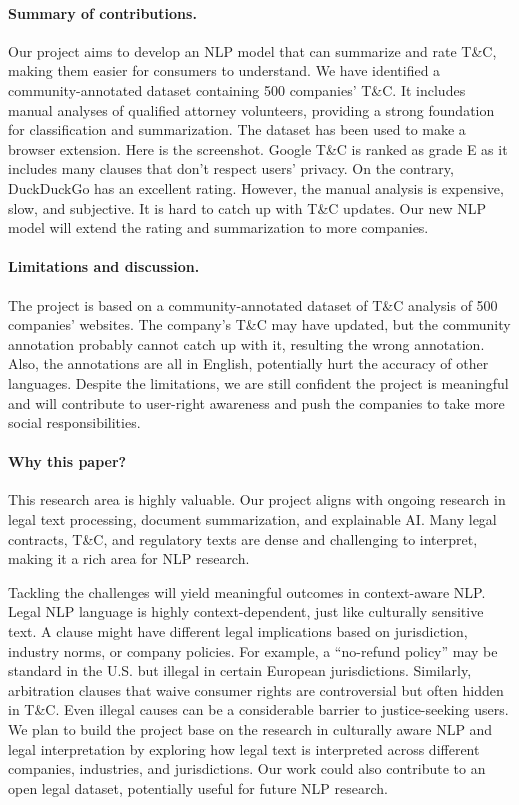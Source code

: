 \documentclass{article}
\begin{document}
\paragraph{Summary of contributions.}
Our project aims to develop an NLP model that can summarize and rate T\&C, making them easier for consumers to understand. We have identified a community-annotated dataset containing 500 companies' T\&C. It includes manual analyses of qualified attorney volunteers, providing a strong foundation for classification and summarization. The dataset has been used to make a browser extension. Here is the screenshot. Google T\&C is ranked as grade E as it includes many clauses that don’t respect users' privacy. On the contrary, DuckDuckGo has an excellent rating. However, the manual analysis is expensive, slow, and subjective. It is hard to catch up with T\&C updates. Our new NLP model will extend the rating and summarization to more companies.

\paragraph{Limitations and discussion.}
The project is based on a community-annotated dataset of T\&C analysis of 500 companies' websites. The company's T\&C may have updated, but the community annotation probably cannot catch up with it, resulting the wrong annotation.
Also, the annotations are all in English, potentially hurt the accuracy of other languages.
Despite the limitations, we are still confident the project is meaningful and will contribute to user-right awareness and push the companies to take more social responsibilities.

\paragraph{Why this paper?}

This research area is highly valuable. Our project aligns with ongoing research in legal text processing, document summarization, and explainable AI. Many legal contracts, T\&C, and regulatory texts are dense and challenging to interpret, making it a rich area for NLP research. 

Tackling the challenges will yield meaningful outcomes in context-aware NLP. Legal NLP language is highly context-dependent, just like culturally sensitive text. A clause might have different legal implications based on jurisdiction, industry norms, or company policies. For example, a “no-refund policy” may be standard in the U.S. but illegal in certain European jurisdictions. Similarly, arbitration clauses that waive consumer rights are controversial but often hidden in T\&C. Even illegal causes can be a considerable barrier to justice-seeking users. We plan to build the project base on the research in culturally aware NLP and legal interpretation by exploring how legal text is interpreted across different companies, industries, and jurisdictions. Our work could also contribute to an open legal dataset, potentially useful for future NLP research.
\end{document}
